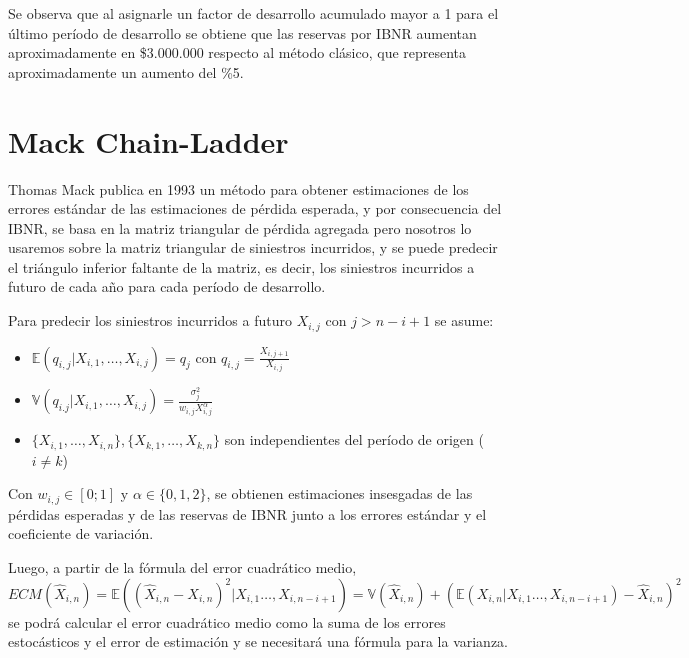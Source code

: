 \documentclass[
  12pt,
]{article}
\begin{document}
Se observa que al asignarle un factor de desarrollo acumulado mayor a 1
para el último período de desarrollo se obtiene que las reservas por
IBNR aumentan aproximadamente en \$3.000.000 respecto al método clásico,
que representa aproximadamente un aumento del \%5.

\hypertarget{mack-chain-ladder}{%
\section{Mack Chain-Ladder}\label{mack-chain-ladder}}

Thomas Mack publica en 1993 un método para obtener estimaciones de los
errores estándar de las estimaciones de pérdida esperada, y por
consecuencia del IBNR, se basa en la matriz triangular de pérdida
agregada pero nosotros lo usaremos sobre la matriz triangular de
siniestros incurridos, y se puede predecir el triángulo inferior
faltante de la matriz, es decir, los siniestros incurridos a futuro de
cada año para cada período de desarrollo.

Para predecir los siniestros incurridos a futuro \(X_{i,j}\) con
\(j>n-i+1\) se asume:

\begin{itemize}

\item $\mathbb{E}(q_{i,j}|X_{i,1},\ldots,X_{i,j}) = q_j$ con $q_{i,j} = \frac{X_{i,j+1}}{X_{i,j}}$

\item $\mathbb{V}(q_{i.j}|X_{i,1},\ldots,X_{i,j}) = \frac{\sigma^2_j}{w_{i,j}X_{i,j}^\alpha} $

\item $\{ X_{i,1},\ldots,X_{i,n} \}, \{X_{k,1},\ldots,X_{k,n}\}$ son independientes del período de origen ($i \neq k$)

\end{itemize}

Con \(w_{i,j} \in [0;1]\) y \(\alpha \in \{0,1,2\}\), se obtienen
estimaciones insesgadas de las pérdidas esperadas y de las reservas de
IBNR junto a los errores estándar y el coeficiente de variación.

Luego, a partir de la fórmula del error cuadrático medio,
\(ECM(\hat{X}_{i,n})=\mathbb{E}((\hat{X}_{i,n}-X_{i,n})^2|X_{i,1}\ldots,X_{i,n-i+1})=\mathbb{V}(\hat{X}_{i,n}) + (\mathbb{E}(X_{i,n}|X_{i,1}\ldots,X_{i,n-i+1})-\hat{X}_{i,n})^2\)
se podrá calcular el error cuadrático medio como la suma de los errores
estocásticos y el error de estimación y se necesitará una fórmula para
la varianza.
\end{document}
